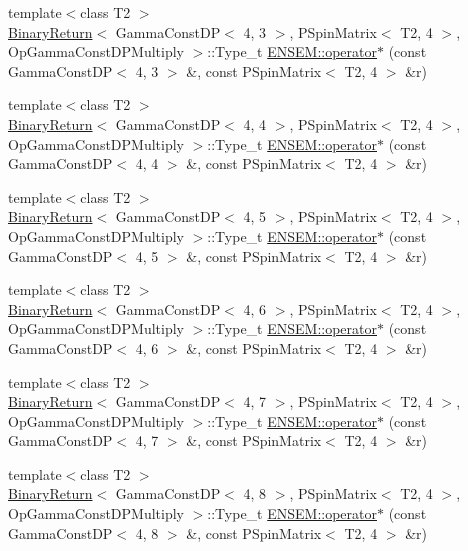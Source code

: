 \begin{DoxyCompactItemize}
\item 
{\footnotesize template$<$class T2 $>$ }\\\mbox{\hyperlink{structBinaryReturn}{Binary\+Return}}$<$ Gamma\+Const\+DP$<$ 4, 3 $>$, P\+Spin\+Matrix$<$ T2, 4 $>$, Op\+Gamma\+Const\+D\+P\+Multiply $>$\+::Type\+\_\+t \mbox{\hyperlink{group__primspinmatrix_gae21434001730b61b41c47db91f4a45ba}{E\+N\+S\+E\+M\+::operator$\ast$}} (const Gamma\+Const\+DP$<$ 4, 3 $>$ \&, const P\+Spin\+Matrix$<$ T2, 4 $>$ \&r)
\item 
{\footnotesize template$<$class T2 $>$ }\\\mbox{\hyperlink{structBinaryReturn}{Binary\+Return}}$<$ Gamma\+Const\+DP$<$ 4, 4 $>$, P\+Spin\+Matrix$<$ T2, 4 $>$, Op\+Gamma\+Const\+D\+P\+Multiply $>$\+::Type\+\_\+t \mbox{\hyperlink{group__primspinmatrix_ga5399e919ac66849bae0231bd88b07167}{E\+N\+S\+E\+M\+::operator$\ast$}} (const Gamma\+Const\+DP$<$ 4, 4 $>$ \&, const P\+Spin\+Matrix$<$ T2, 4 $>$ \&r)
\item 
{\footnotesize template$<$class T2 $>$ }\\\mbox{\hyperlink{structBinaryReturn}{Binary\+Return}}$<$ Gamma\+Const\+DP$<$ 4, 5 $>$, P\+Spin\+Matrix$<$ T2, 4 $>$, Op\+Gamma\+Const\+D\+P\+Multiply $>$\+::Type\+\_\+t \mbox{\hyperlink{group__primspinmatrix_ga236159edb8e3e69f1a1813261364b3b3}{E\+N\+S\+E\+M\+::operator$\ast$}} (const Gamma\+Const\+DP$<$ 4, 5 $>$ \&, const P\+Spin\+Matrix$<$ T2, 4 $>$ \&r)
\item 
{\footnotesize template$<$class T2 $>$ }\\\mbox{\hyperlink{structBinaryReturn}{Binary\+Return}}$<$ Gamma\+Const\+DP$<$ 4, 6 $>$, P\+Spin\+Matrix$<$ T2, 4 $>$, Op\+Gamma\+Const\+D\+P\+Multiply $>$\+::Type\+\_\+t \mbox{\hyperlink{group__primspinmatrix_ga065100ce0a5fe4278e64d79e1b21c8c7}{E\+N\+S\+E\+M\+::operator$\ast$}} (const Gamma\+Const\+DP$<$ 4, 6 $>$ \&, const P\+Spin\+Matrix$<$ T2, 4 $>$ \&r)
\item 
{\footnotesize template$<$class T2 $>$ }\\\mbox{\hyperlink{structBinaryReturn}{Binary\+Return}}$<$ Gamma\+Const\+DP$<$ 4, 7 $>$, P\+Spin\+Matrix$<$ T2, 4 $>$, Op\+Gamma\+Const\+D\+P\+Multiply $>$\+::Type\+\_\+t \mbox{\hyperlink{group__primspinmatrix_ga2c4f08577a26616df666f15bc0a836e8}{E\+N\+S\+E\+M\+::operator$\ast$}} (const Gamma\+Const\+DP$<$ 4, 7 $>$ \&, const P\+Spin\+Matrix$<$ T2, 4 $>$ \&r)
\item 
{\footnotesize template$<$class T2 $>$ }\\\mbox{\hyperlink{structBinaryReturn}{Binary\+Return}}$<$ Gamma\+Const\+DP$<$ 4, 8 $>$, P\+Spin\+Matrix$<$ T2, 4 $>$, Op\+Gamma\+Const\+D\+P\+Multiply $>$\+::Type\+\_\+t \mbox{\hyperlink{group__primspinmatrix_ga15c8807596a50758b2f396f050d763c8}{E\+N\+S\+E\+M\+::operator$\ast$}} (const Gamma\+Const\+DP$<$ 4, 8 $>$ \&, const P\+Spin\+Matrix$<$ T2, 4 $>$ \&r)

\end{DoxyCompactItemize}
